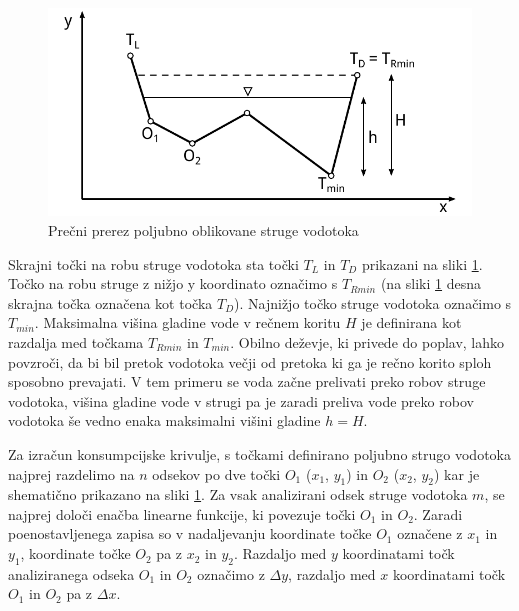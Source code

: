 \begin{figure}[ht!]
	\begin{centering}
		\includegraphics{slike/customChannel/customStruga.pdf}\caption{Prečni prerez poljubno oblikovane struge vodotoka}\label{fig:poljubnaStruga}
	\end{centering}
\end{figure}



Skrajni točki na robu struge vodotoka sta točki $T_L$ in $T_D$ prikazani na sliki \ref{fig:poljubnaStruga}. Točko na robu struge z nižjo y koordinato označimo s $T_{Rmin}$ (na sliki \ref{fig:poljubnaStruga} desna skrajna točka označena kot točka $T_D$). Najnižjo točko struge vodotoka označimo s $T_{min}$. Maksimalna višina gladine vode v rečnem koritu $H$ je definirana kot razdalja med točkama $T_{Rmin}$ in $T_{min}$. Obilno deževje, ki privede do poplav, lahko povzroči, da bi bil pretok vodotoka večji od pretoka ki ga je rečno korito sploh sposobno prevajati. V tem primeru se voda začne prelivati preko robov struge vodotoka, višina gladine vode v strugi pa je zaradi preliva vode preko robov vodotoka še vedno enaka maksimalni višini gladine $h=H$.



Za izračun konsumpcijske krivulje, s točkami definirano poljubno strugo vodotoka najprej razdelimo na $n$ odsekov po dve točki $O_1$ ($x_1$, $y_1$) in $O_2$ ($x_2$, $y_2$) kar je shematično prikazano na sliki \ref{fig:poljubnaStruga}. Za vsak analizirani odsek struge vodotoka $m$, se najprej določi enačba linearne funkcije, ki povezuje točki $O_1$ in $O_2$.  Zaradi poenostavljenega zapisa so v nadaljevanju koordinate točke $O_1$ označene z $x_1$ in $y_1$, koordinate točke $O_2$ pa z $x_2$ in $y_2$. Razdaljo med $y$ koordinatami točk analiziranega odseka $O_1$ in $O_2$ označimo z $\Delta y$, razdaljo med $x$ koordinatami točk $O_1$ in $O_2$ pa z $\Delta x$.


